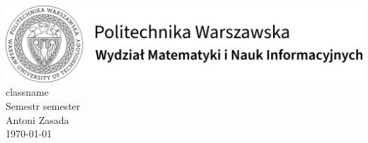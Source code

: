 \documentclass[a4paper,12pt]{article}
\begin{document}
\begin{titlepage}
    \begin{center}
        \includegraphics[scale=1]{logo_mini.png}
        \vspace{0.1\textheight}
        \\\Huge\textsf{{{classname}}\\
            \medskip
        \large Semestr {{semester}}\\}
        \vspace{0.35\textheight}
        \Large Antoni Zasada\\
        \medskip
        \normalsize \today
    \end{center}
\end{titlepage}
\end{document}
